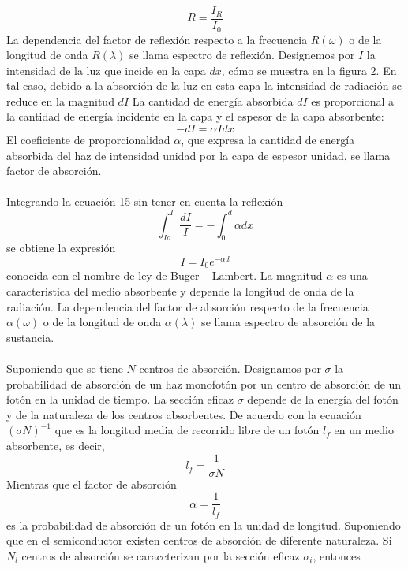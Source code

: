 \documentclass[12]{article}
\begin{document}
\begin{multicols}{2}
\begin{equation}
R = \frac{I_{R}}{I_{0}}
\end{equation}
La dependencia del factor de reflexión respecto a la frecuencia $R(\omega)$ o de la longitud de onda $R(\lambda)$ se llama espectro de reflexión.
Designemos por $I$ la intensidad de la luz que incide en la capa $dx$, cómo se muestra en la figura 2. En tal caso, debido a la absorción de la luz en esta capa la intensidad de radiación se reduce en la magnitud $dI$ La cantidad de energía absorbida $dI$ es proporcional a la cantidad de energía incidente   en la capa y el espesor de la capa absorbente:
\begin{equation}
-dI = \alpha I dx
\end{equation}
El coeficiente de proporcionalidad $\alpha$, que expresa la cantidad de energía absorbida del haz de intensidad unidad por la capa de espesor unidad, se llama factor de absorción.
\\ \\
Integrando la ecuación 15 sin tener en cuenta la reflexión 
\begin{equation}
\int_{Io}^{I} \frac{dI}{I} = - \int_{0}^{d} \alpha dx 
\end{equation}
se obtiene la expresión 
\begin{equation}
I = I_{0}e^{- \alpha d}
\end{equation}
conocida con el nombre de ley de Buger – Lambert. La magnitud $\alpha$ es una caracteristica del medio absorbente y depende la longitud de onda de la radiación. La dependencia del factor de absorción respecto de la frecuencia $\alpha(\omega)$ o de la longitud de onda $\alpha(\lambda)$ se llama espectro de absorción de la sustancia.
\\ \\
Suponiendo que se tiene $N$ centros de absorción. Designamos por $\sigma$ la probabilidad de absorción de un haz monofotón por un centro de absorción de un fotón en la unidad de tiempo. La sección eficaz $\sigma$ depende de la energía del fotón y de la naturaleza de los centros absorbentes.
De acuerdo con la ecuación $(\sigma N)^{-1}$ que es la longitud media de recorrido libre de un fotón $l_{f}$ en un medio absorbente, es decir,
\begin{equation}
l_{f} = \frac{1}{\sigma N}
\end{equation}
Mientras que el factor de absorción 
\begin{equation}
\alpha = \frac{1}{l_{f}}
\end{equation}
es la probabilidad de absorción de un fotón en la unidad de longitud. Suponiendo que en el semiconductor existen centros de absorción de diferente naturaleza. Si $N_{l}$ centros de absorción se caraccterizan por la sección eficaz $\sigma_{i}$, entonces

\end{multicols}
\end{document}

